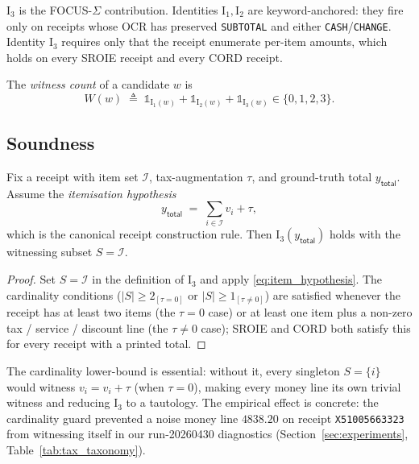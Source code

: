 \noindent
$\mathrm{I}_3$ is the FOCUS-$\Sigma$ contribution.  Identities
$\mathrm{I}_1, \mathrm{I}_2$ are keyword-anchored: they fire only on
receipts whose OCR has preserved \texttt{SUBTOTAL} and either
\texttt{CASH}/\texttt{CHANGE}.  Identity $\mathrm{I}_3$ requires only
that the receipt enumerate per-item amounts, which holds on every
SROIE receipt and every CORD receipt.

The \emph{witness count} of a candidate $w$ is
\[
W(w) \;\triangleq\; \mathds{1}_{\mathrm{I}_1(w)} +
\mathds{1}_{\mathrm{I}_2(w)} + \mathds{1}_{\mathrm{I}_3(w)} \in
\{0,1,2,3\}.
\]

\subsection{Soundness}
\label{sec:focus_sigma_sound}

\begin{proposition}
\label{prop:soundness}
Fix a receipt with item set $\mathcal{I}$, tax-augmentation $\tau$,
and ground-truth total $y_{\textsf{total}}$.  Assume the
\emph{itemisation hypothesis}
\begin{equation}
y_{\textsf{total}} \;=\; \sum_{i \in \mathcal{I}} v_i + \tau,
\label{eq:item_hypothesis}
\end{equation}
which is the canonical receipt construction rule.  Then
$\mathrm{I}_3(y_{\textsf{total}})$ holds with the witnessing subset
$S = \mathcal{I}$.
\end{proposition}

\begin{proof}
Set $S = \mathcal{I}$ in the definition of $\mathrm{I}_3$ and apply
\eqref{eq:item_hypothesis}.  The cardinality conditions
($|S|\ge 2_{[\tau=0]}$ or $|S|\ge 1_{[\tau\ne 0]}$) are satisfied
whenever the receipt has at least two items (the
$\tau=0$ case) or at least one item plus a non-zero
tax / service / discount line (the $\tau\ne 0$ case); SROIE and
CORD both satisfy this for every receipt with a printed total.
\end{proof}

The cardinality lower-bound is essential: without it, every singleton
$S = \{i\}$ would witness $v_i = v_i + \tau$ (when $\tau=0$), making
every money line its own trivial witness and reducing $\mathrm{I}_3$
to a tautology.  The empirical effect is concrete: the cardinality
guard prevented a noise money line $4838.20$ on receipt
\texttt{X51005663323} from witnessing itself in our run-20260430
diagnostics (Section~\ref{sec:experiments}, Table~\ref{tab:tax_taxonomy}).

